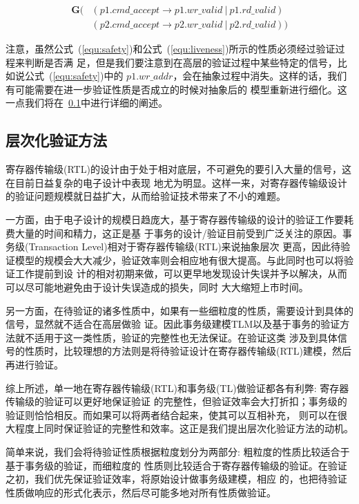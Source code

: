 \begin{equation} \label{equ:liveness}
\begin{split}
\mathbf{G}(
&(p1.cmd\_accept \rightarrow p1.wr\_valid\ |\ p1.rd\_valid)\\
&(p2.cmd\_accept \rightarrow p2.wr\_valid\ |\ p2.rd\_valid))
\end{split}
\end{equation}

注意，虽然公式~(\ref{equ:safety})和公式~(\ref{equ:liveness})所示的性质必须经过验证过程来判断是否满
足，但是我们要注意到在高层的验证过程中某些特定的信号，比如说公式~(\ref{equ:safety})中的
$p1.wr\_addr$，会在抽象过程中消失。这样的话，我们有可能需要在进一步验证性质是否成立的时候对抽象后的
模型重新进行细化。这一点我们将在~\ref{sec:hierarchy-method}中进行详细的阐述。


\subsection{层次化验证方法}
\label{sec:hierarchy-method}

寄存器传输级(RTL)的设计由于处于相对底层，不可避免的要引入大量的信号，这在目前日益复杂的电子设计中表现
地尤为明显。这样一来，对寄存器传输级设计的验证问题规模就日益扩大，从而给验证技术带来了不小的难题。

一方面，由于电子设计的规模日趋庞大，基于寄存器传输级的设计的验证工作要耗费大量的时间和精力，这正是基
于事务的设计/验证目前受到广泛关注的原因。事务级(Transaction Level)相对于寄存器传输级(RTL)来说抽象层次
更高，因此待验证模型的规模会大大减少，验证效率则会相应地有很大提高。与此同时也可以将验证工作提前到设
计的相对初期来做，可以更早地发现设计失误并予以解决，从而可以尽可能地避免由于设计失误造成的损失，同时
大大缩短上市时间。

另一方面，在待验证的诸多性质中，如果有一些细粒度的性质，需要设计到具体的信号，显然就不适合在高层做验
证。因此事务级建模TLM以及基于事务的验证方法就不适用于这一类性质，验证的完整性也无法保证。在验证这类
涉及到具体信号的性质时，比较理想的方法则是将待验证设计在寄存器传输级(RTL)建模，然后再进行验证。

综上所述，单一地在寄存器传输级(RTL)和事务级(TL)做验证都各有利弊: 寄存器传输级的验证可以更好地保证验证
的完整性，但验证效率会大打折扣；事务级的验证则恰恰相反。而如果可以将两者结合起来，使其可以互相补充，
则可以在很大程度上同时保证验证的完整性和效率。这正是我们提出层次化验证方法的动机。

简单来说，我们会将待验证性质根据粒度划分为两部分: 粗粒度的性质比较适合于基于事务级的验证，而细粒度的
性质则比较适合于寄存器传输级的验证。在验证之初，我们优先保证验证效率，将原始设计做事务级建模，相应
的，也把待验证性质做响应的形式化表示，然后尽可能多地对所有性质做验证。


